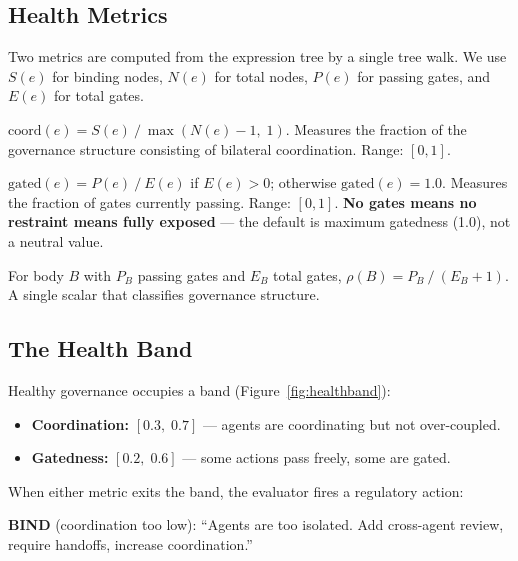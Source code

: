\documentclass[sigconf,nonacm]{acmart}
\begin{document}
\subsection{Health Metrics}

Two metrics are computed from the expression tree by a single tree walk.
We use $S(e)$ for binding nodes, $N(e)$ for total nodes, $P(e)$ for
passing gates, and $E(e)$ for total gates.

\begin{definition}[Coordination]
$\mathrm{coord}(e) = S(e) \mathbin{/} \max(N(e) - 1,\; 1)$.
Measures the fraction of the governance structure consisting of
bilateral coordination. Range: $[0, 1]$.
\end{definition}

\begin{definition}[Gatedness]
$\mathrm{gated}(e) = P(e) \mathbin{/} E(e)$ if $E(e) > 0$;
otherwise $\mathrm{gated}(e) = 1.0$.
Measures the fraction of gates currently passing. Range: $[0, 1]$.
\textbf{No gates means no restraint means fully exposed} --- the
default is maximum gatedness (1.0), not a neutral value.
\end{definition}

\begin{definition}
For body $B$ with $P_B$ passing gates and $E_B$ total gates,
$\rho(B) = P_B \mathbin{/} (E_B + 1)$.
A single scalar that classifies governance structure.
\end{definition}

\subsection{The Health Band}

Healthy governance occupies a band (Figure~\ref{fig:healthband}):

\begin{itemize}[leftmargin=*]
  \item \textbf{Coordination:} $[0.3,\; 0.7]$ --- agents are coordinating
    but not over-coupled.
  \item \textbf{Gatedness:} $[0.2,\; 0.6]$ --- some actions pass freely,
    some are gated.
\end{itemize}

When either metric exits the band, the evaluator fires a regulatory action:

\textbf{BIND} (coordination too low): ``Agents are too isolated. Add
cross-agent review, require handoffs, increase coordination.''
\end{document}
